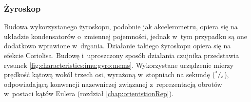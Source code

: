 \subsubsection*{Żyroskop}
Budowa wykorzystanego żyroskopu, podobnie jak akcelerometru, opiera się na układzie kondensatorów o~zmiennej pojemności, jednak w~tym przypadku są one dodatkowo wprawione w~drgania. Działanie takiego żyroskopu opiera się na efekcie Coriolisa. Budowę i~uproszczony sposób działania czujnika przedstawia rysunek \ref{fig:characteristics:imu:gyro:mems}. Wykorzystane urządzenie mierzy prędkość kątową wokół trzech osi, wyrażoną w~stopniach na sekundę ($^\degree/_s$), odpowiadającą konwencji nazewniczej związanej z~reprezentacją obrotów w~postaci kątów Eulera (rozdział \ref{chap:orientstionRep}).
																																						
